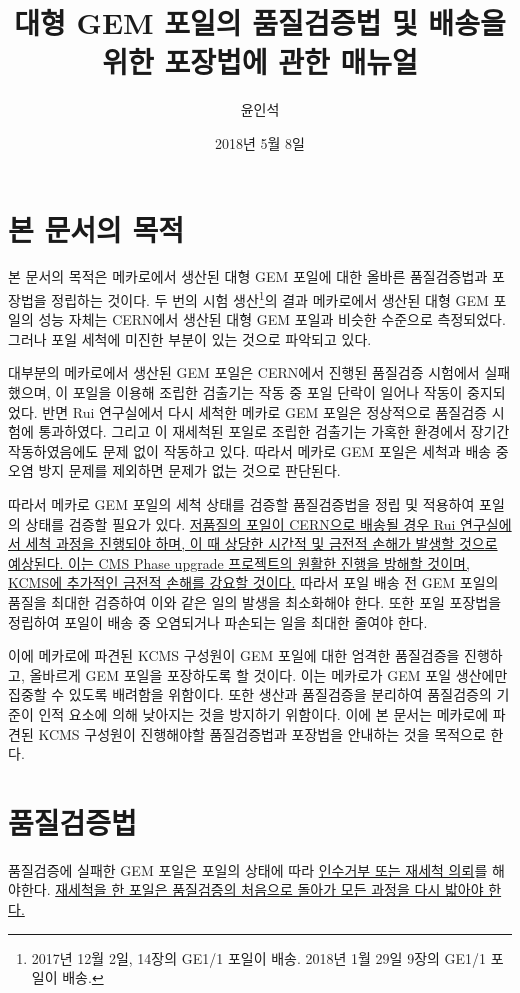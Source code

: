 \documentclass[11pt]{article}
\title{대형 GEM 포일의 품질검증법 및 배송을 위한 포장법에 관한  매뉴얼}
\author{윤인석}
\date{2018년 5월 8일}
\begin{document}
\maketitle
\tableofcontents
\listoffigures
\listoftables


\section{본 문서의 목적}
본 문서의 목적은 메카로에서 생산된 대형 GEM 포일에 대한 올바른 품질검증법과 포장법을 정립하는 것이다. 두 번의 시험 생산\footnote{2017년 12월 2일, 14장의 GE1/1 포일이 배송. 2018년 1월 29일 9장의 GE1/1 포일이 배송.}의 결과 메카로에서 생산된 대형 GEM 포일의 성능 자체는 CERN에서 생산된 대형 GEM 포일과 비슷한 수준으로 측정되었다. 그러나 포일 세척에 미진한 부분이 있는 것으로 파악되고 있다.

대부분의 메카로에서 생산된 GEM 포일은 CERN에서 진행된 품질검증 시험에서 실패했으며, 이 포일을 이용해 조립한 검출기는 작동 중 포일 단락이 일어나 작동이 중지되었다. 반면  Rui 연구실에서 다시 세척한 메카로 GEM 포일은 정상적으로 품질검증 시험에 통과하였다. 그리고 이 재세척된 포일로 조립한 검출기는 가혹한 환경에서 장기간 작동하였음에도 문제 없이 작동하고 있다. 따라서 메카로 GEM 포일은 세척과 배송 중 오염 방지 문제를 제외하면 문제가 없는 것으로 판단된다.

따라서 메카로 GEM 포일의 세척 상태를 검증할 품질검증법을 정립 및 적용하여 포일의 상태를 검증할 필요가 있다. \uline{저품질의 포일이 CERN으로 배송될 경우 Rui 연구실에서 세척 과정을 진행되야 하며, 이 때 상당한 시간적 및 금전적 손해가 발생할 것으로 예상된다. 이는 CMS Phase  upgrade 프로젝트의 원활한 진행을 방해할 것이며, KCMS에 추가적인 금전적 손해를 강요할 것이다.} 따라서 포일 배송 전 GEM 포일의 품질을 최대한 검증하여 이와 같은 일의 발생을 최소화해야 한다. 또한 포일 포장법을 정립하여 포일이 배송 중 오염되거나 파손되는 일을 최대한 줄여야 한다.

이에 메카로에 파견된 KCMS 구성원이 GEM 포일에 대한 엄격한 품질검증을 진행하고, 올바르게 GEM 포일을 포장하도록 할 것이다. 이는 메카로가 GEM 포일 생산에만 집중할 수 있도록 배려함을 위함이다. 또한 생산과 품질검증을 분리하여 품질검증의 기준이 인적 요소에 의해 낮아지는 것을 방지하기 위함이다. 이에 본 문서는 메카로에 파견된 KCMS 구성원이 진행해야할 품질검증법과 포장법을 안내하는 것을 목적으로 한다.

\section{품질검증법}
품질검증에 실패한 GEM 포일은 포일의 상태에 따라 \uline{인수거부 또는 재세척 의뢰}를 해야한다. \uline{재세척을 한 포일은 품질검증의 처음으로 돌아가 모든 과정을 다시 밟아야 한다.} 
\end{document}
